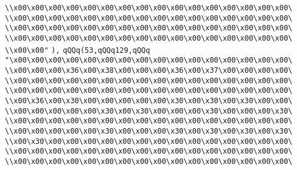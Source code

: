 \verb|\\x00\x00\x00\x00\x00\x00\x00\x00\x00\x00\x00\x00\x00\x00\x00\x00\|\newline
\verb|\\x00\x00\x00\x00\x00\x00\x00\x00\x00\x00\x00\x00\x00\x00\x00\x00\|\newline
\verb|\\x00\x00\x00\x00\x00\x00\x00\x00\x00\x00\x00\x00\x00\x00\x00\x00\|\newline
\verb|\\x00\x00\x00\x00\x00\x00\x00\x00\x00\x00\x00\x00\x00\x00\x00\x00\|\newline
\verb|\\x00\x00"|\newline
\verb|),|\newline
\verb|qQQq(53,qQQq129,qQQq|\newline
\verb|"\x00\x00\x00\x00\x00\x00\x00\x00\x00\x00\x00\x00\x00\x00\x00\x00\|\newline
\verb|\\x00\x00\x00\x36\x00\x38\x00\x00\x00\x36\x00\x37\x00\x00\x00\x00\|\newline
\verb|\\x00\x00\x00\x00\x00\x00\x00\x00\x00\x00\x00\x00\x00\x00\x00\x00\|\newline
\verb|\\x00\x00\x00\x00\x00\x00\x00\x00\x00\x00\x00\x00\x00\x00\x00\x00\|\newline
\verb|\\x00\x36\x00\x30\x00\x00\x00\x00\x00\x30\x00\x30\x00\x30\x00\x00\|\newline
\verb|\\x00\x00\x00\x00\x00\x30\x00\x30\x00\x00\x00\x30\x00\x00\x00\x30\|\newline
\verb|\\x00\x00\x00\x00\x00\x00\x00\x00\x00\x00\x00\x00\x00\x00\x00\x00\|\newline
\verb|\\x00\x00\x00\x00\x00\x30\x00\x00\x00\x30\x00\x30\x00\x30\x00\x30\|\newline
\verb|\\x00\x30\x00\x00\x00\x00\x00\x00\x00\x00\x00\x00\x00\x00\x00\x00\|\newline
\verb|\\x00\x00\x00\x00\x00\x00\x00\x00\x00\x00\x00\x00\x00\x00\x00\x00\|\newline
\verb|\\x00\x00\x00\x00\x00\x00\x00\x00\x00\x00\x00\x00\x00\x00\x00\x00\|\newline
